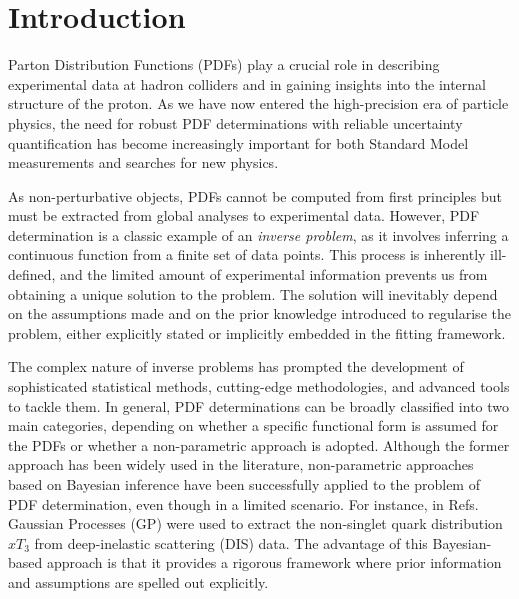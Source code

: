 \section{Introduction}
\label{sec:intro}

Parton Distribution Functions (PDFs) play a crucial role in describing
experimental data at hadron colliders and in gaining insights into the internal
structure of the proton. As we have now entered the high-precision era of
particle physics, the need for robust PDF determinations with reliable
uncertainty quantification has become increasingly important for both Standard
Model measurements and searches for new physics.

As non-perturbative objects, PDFs cannot be computed from first principles
but must be extracted from global analyses to experimental data. However, PDF
determination is a classic example of an \textit{inverse problem}, as it
involves inferring a continuous function from a finite set of data points. This
process is inherently ill-defined, and the limited amount of experimental
information prevents us from obtaining a unique solution to the problem. The
solution will inevitably depend on the assumptions made and on the prior
knowledge introduced to regularise the problem, either explicitly stated or
implicitly embedded in the fitting framework.

The complex nature of inverse problems has prompted the development of
sophisticated statistical methods, cutting-edge methodologies, and advanced
tools to tackle them. In general, PDF determinations can be broadly classified
into two main categories, depending on whether a specific functional form is
assumed for the PDFs or whether a non-parametric approach is adopted. Although
the former approach has been widely used in the literature, non-parametric
approaches based on Bayesian inference have been successfully applied to the
problem of PDF determination, even though in a limited scenario. For instance,
in Refs.~\cite{DelDebbio:2021whr,Candido:2024hjt} Gaussian Processes (GP) were
used to extract the non-singlet quark distribution $xT_3$ from deep-inelastic
scattering (DIS) data. The advantage of this Bayesian-based approach is that it
provides a rigorous framework where prior information and assumptions are spelled
out explicitly.

